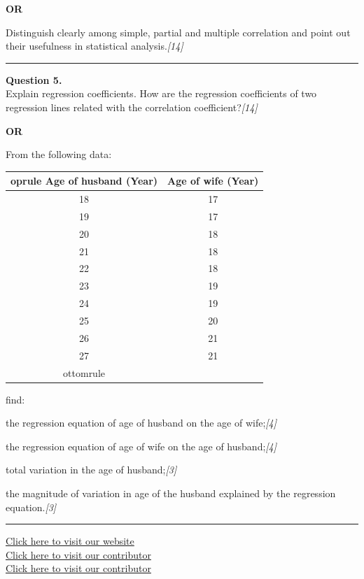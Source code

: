 \documentclass[11pt,a4paper]{article}
\newcommand{\pts}[1]{\hfill   \textit{[#1]}}
\begin{document}
\centerline{   \textbf{OR}}

Distinguish clearly among simple, partial and multiple correlation and point out their usefulness in statistical analysis.\pts{14}

\medskip\rule{\linewidth}{0.2pt}




\noindent   \textbf{Question 5.} \\
Explain regression coefficients. How are the regression coefficients of two regression lines related with the correlation coefficient?\pts{14}

\centerline{   \textbf{OR}}

From the following data:

\begin{center}
  
\begin{tabular}{cc}
     oprule
   \textbf{Age of husband (Year)} &   \textbf{Age of wife (Year)} \\
    \midrule
    18 & 17 \\
    19 & 17 \\
    20 & 18 \\
    21 & 18 \\
    22 & 18 \\
    23 & 19 \\
    24 & 19 \\
    25 & 20 \\
    26 & 21 \\
    27 & 21 \\
    ottomrule
  \end{tabular}
\end{center}
find:

\begin{parts}
  \item the regression equation of age of husband on the age of wife;\pts{4}
  \item the regression equation of age of wife on the age of husband;\pts{4}
  \item total variation in the age of husband;\pts{3}
  \item the magnitude of variation in age of the husband explained by the regression equation.\pts{3}
\end{parts}

\vfill
\rule{\linewidth}{0.4pt}

\begin{center}\small
  \href{https://bhu-exam.vercel.app/}{Click here to visit our website}\\[4pt]
  \href{https://me-aryan.vercel.app/}{Click here to visit our contributor}\\[4pt]
  \href{https://quashan-me.vercel.app/}{Click here to visit our contributor}
\end{center}
\end{document}
